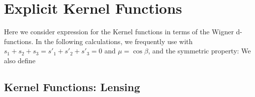 \documentclass{article}
\begin{document}
\newpage

\section{Explicit Kernel Functions}

Here we consider expression for the Kernel functions in terms of the Wigner d-functions. 
In the following calculations, we frequently use 
with $s_1+s_2+s_3=s'_1+s'_2+s'_3=0$ and $\mu=\cos\beta$, and the symmetric property: 
We also define 

\subsection{Kernel Functions: Lensing}
\end{document}
